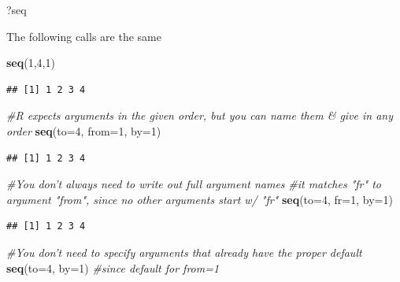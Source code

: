 \documentclass[]{article}
\newenvironment{Shaded}{\begin{snugshade}}{\end{snugshade}}
\newcommand{\KeywordTok}[1]{\textcolor[rgb]{0.13,0.29,0.53}{\textbf{#1}}}
\newcommand{\DataTypeTok}[1]{\textcolor[rgb]{0.13,0.29,0.53}{#1}}
\newcommand{\DecValTok}[1]{\textcolor[rgb]{0.00,0.00,0.81}{#1}}
\newcommand{\CommentTok}[1]{\textcolor[rgb]{0.56,0.35,0.01}{\textit{#1}}}
\newcommand{\NormalTok}[1]{#1}
\begin{document}
\begin{Shaded}
\begin{Highlighting}[]
\NormalTok{?seq}
\end{Highlighting}
\end{Shaded}

The following calls are the same

\begin{Shaded}
\begin{Highlighting}[]
\KeywordTok{seq}\NormalTok{(}\DecValTok{1}\NormalTok{,}\DecValTok{4}\NormalTok{,}\DecValTok{1}\NormalTok{)}
\end{Highlighting}
\end{Shaded}

\begin{verbatim}
## [1] 1 2 3 4
\end{verbatim}

\begin{Shaded}
\begin{Highlighting}[]
\CommentTok{#R expects arguments in the given order, but you can name them & give in any order}
\KeywordTok{seq}\NormalTok{(}\DataTypeTok{to=}\DecValTok{4}\NormalTok{, }\DataTypeTok{from=}\DecValTok{1}\NormalTok{, }\DataTypeTok{by=}\DecValTok{1}\NormalTok{)}
\end{Highlighting}
\end{Shaded}

\begin{verbatim}
## [1] 1 2 3 4
\end{verbatim}

\begin{Shaded}
\begin{Highlighting}[]
\CommentTok{#You don't always need to write out full argument names}
\CommentTok{#it matches "fr" to argument "from", since no other arguments start w/ "fr"}
\KeywordTok{seq}\NormalTok{(}\DataTypeTok{to=}\DecValTok{4}\NormalTok{, }\DataTypeTok{fr=}\DecValTok{1}\NormalTok{, }\DataTypeTok{by=}\DecValTok{1}\NormalTok{)}
\end{Highlighting}
\end{Shaded}

\begin{verbatim}
## [1] 1 2 3 4
\end{verbatim}

\begin{Shaded}
\begin{Highlighting}[]
\CommentTok{#You don't need to specify arguments that already have the proper default}
\KeywordTok{seq}\NormalTok{(}\DataTypeTok{to=}\DecValTok{4}\NormalTok{, }\DataTypeTok{by=}\DecValTok{1}\NormalTok{) }\CommentTok{#since default for from=1}
\end{Highlighting}
\end{Shaded}
\end{document}
